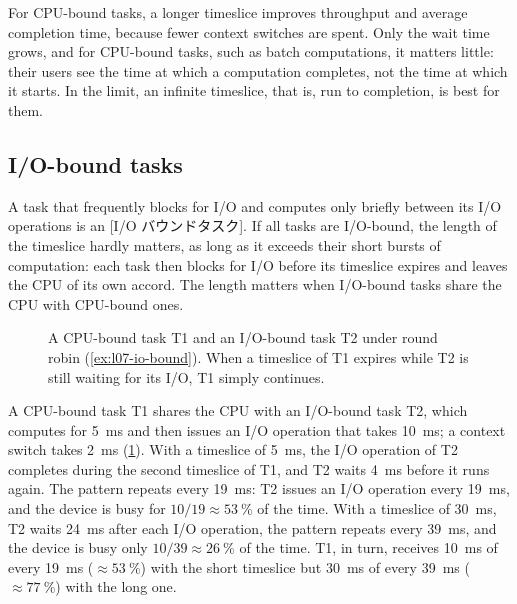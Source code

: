 \documentclass[../main.tex]{subfiles}
\begin{document}
For CPU-bound tasks, a longer timeslice improves throughput and average
completion time, because fewer context switches are spent.  Only the wait
time grows, and for CPU-bound tasks, such as batch computations, it matters
little: their users see the time at which a computation completes, not the
time at which it starts.  In the limit, an infinite timeslice, that is,
run to completion, is best for them.

\subsection{I/O-bound tasks}

A task that frequently blocks for I/O and computes only briefly between its
I/O operations is an [I/O バウンドタスク].  If all tasks
are I/O-bound, the length of the timeslice hardly matters, as long as it
exceeds their short bursts of computation: each task then blocks for I/O
before its timeslice expires and leaves the CPU of its own accord.  The length matters when I/O-bound tasks share the CPU with
CPU-bound ones.

\begin{figure}[htbp]
  \centering
  
  \caption{A CPU-bound task T1 and an I/O-bound task T2 under round robin
    (\cref{ex:l07-io-bound}).  When a timeslice of T1 expires while T2 is
    still waiting for its I/O, T1 simply continues.}
  \label{fig:l07-io-timeslice}
\end{figure}

\begin{example}
  \label{ex:l07-io-bound}
  A CPU-bound task T1 shares the CPU with an I/O-bound task T2, which
  computes for \SI{5}{\milli\second} and then issues an I/O operation that
  takes \SI{10}{\milli\second}; a context switch takes
  \SI{2}{\milli\second} (\cref{fig:l07-io-timeslice}).  With a timeslice of
  \SI{5}{\milli\second}, the I/O operation of T2 completes during the second
  timeslice of T1, and T2 waits \SI{4}{\milli\second} before it runs again.
  The pattern repeats every \SI{19}{\milli\second}: T2 issues an I/O
  operation every \SI{19}{\milli\second}, and the device is busy for
  $10/19 \approx \SI{53}{\percent}$ of the time.  With a timeslice of
  \SI{30}{\milli\second}, T2 waits \SI{24}{\milli\second} after each I/O
  operation, the pattern repeats every \SI{39}{\milli\second}, and the
  device is busy only $10/39 \approx \SI{26}{\percent}$ of the time.  T1, in
  turn, receives \SI{10}{\milli\second} of every \SI{19}{\milli\second}
  ($\approx\SI{53}{\percent}$) with the short timeslice but
  \SI{30}{\milli\second} of every \SI{39}{\milli\second}
  ($\approx\SI{77}{\percent}$) with the long one.
\end{example}
\end{document}
